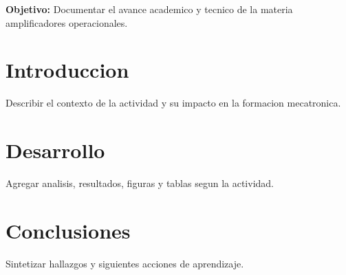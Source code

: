 \documentclass[spanish,letterpaper,oneside]{article}
\begin{document}
\templatePortrait
\templatePagecfg
\onehalfspacing

\begin{abstractd}
\textbf{Objetivo:} Documentar el avance academico y tecnico de la materia amplificadores operacionales.
\end{abstractd}

\templateIndex
\templateFinalcfg

\section{Introduccion}
Describir el contexto de la actividad y su impacto en la formacion mecatronica.

\section{Desarrollo}
Agregar analisis, resultados, figuras y tablas segun la actividad.

\section{Conclusiones}
Sintetizar hallazgos y siguientes acciones de aprendizaje.



\end{document}
